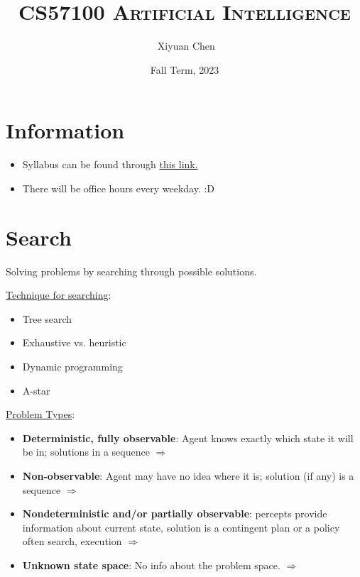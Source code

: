 \documentclass{ainote}
\author{\ccLogo \,\,Xiyuan Chen}
\title{\textsc{CS57100 Artificial Intelligence}}
\date{Fall Term, 2023}
\begin{document}
\maketitle
\doclicenseThis
\section*{Information}
\begin{itemize}
	\item Syllabus can be found through \href{https://purdue.brightspace.com/d2l/le/content/832225/Home}{this link. }
	\item There will be office hours every weekday. :D
\end{itemize}
\tableofcontents
\newpage

\section{Search}
Solving problems by searching through possible solutions.

\underline{Technique for searching}:
\begin{itemize}
    \item Tree search
    \item Exhaustive vs. heuristic
    \item Dynamic programming
    \item A-star
\end{itemize}

\underline{Problem Types}:
\begin{itemize}
    \item \textbf{Deterministic, fully observable}: Agent knows exactly which state it will be in; solutions in a sequence $\Longrightarrow$ 
    \item \textbf{Non-observable}: Agent may have no idea where it is; solution (if any) is a sequence $\Longrightarrow$ 
    \item \textbf{Nondeterministic and/or partially observable}: percepts provide  information about current state, solution is a contingent plan or a policy often  search, execution $\Longrightarrow$ 
    \item \textbf{Unknown state space}: No info about the problem space. $\Longrightarrow$ 
\end{itemize}
\end{document}
